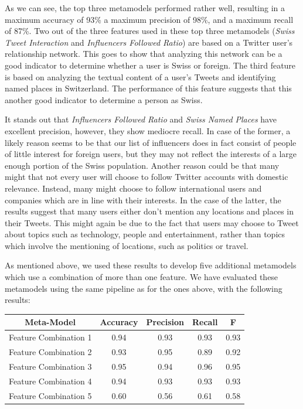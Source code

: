 \documentclass[10pt,a4paper]{article}
\begin{document}
As we can see, the top three metamodels performed rather well, resulting in a maximum accuracy of 93\% a maximum precision of 98\%, and a maximum recall of 87\%. Two out of the three features used in these top three metamodels (\textit{Swiss Tweet Interaction} and \textit{Influencers Followed Ratio}) are based on a Twitter user's relationship network. This goes to show that analyzing this network can be a good indicator to determine whether a user is Swiss or foreign. The third feature is based on analyzing the textual content of a user's Tweets and identifying named places in Switzerland. The performance of this feature suggests that this another good indicator to determine a person as Swiss.

It stands out that \textit{Influencers Followed Ratio} and \textit{Swiss Named Places} have excellent precision, however, they show mediocre recall. In case of the former, a likely reason seems to be that our list of influencers does in fact consist of people of little interest for foreign users, but they may not reflect the interests of a large enough portion of the Swiss population. Another reason could be that many might that not every user will choose to follow Twitter accounts with domestic relevance. Instead, many might choose to follow international users and companies which are in line with their interests. In the case of the latter, the results suggest that many  users either don't mention any locations and places in their Tweets. This might again be due to the fact that users may choose to Tweet about topics such as technology, people and entertainment, rather than topics which involve the mentioning of locations, such as politics or travel.

As mentioned above, we used these results to develop five additional metamodels which use a combination of more than one feature. We have evaluated these metamodels using the same pipeline as for the ones above, with the following results:

\begin{center}
\begin{tabular}{ |c|c|c|c|c| }
\hline
\textbf{Meta-Model} & \textbf{Accuracy} & \textbf{Precision} & \textbf{Recall} & \textbf{F} \\
\hline
Feature Combination 1 & 0.94 & 0.93 & 0.93 & 0.93 \\
\hline
Feature Combination 2 & 0.93 & 0.95 & 0.89 & 0.92 \\
\hline
Feature Combination 3 & 0.95 & 0.94 & 0.96 & 0.95 \\
\hline
Feature Combination 4 & 0.94 & 0.93 & 0.93 & 0.93 \\
\hline
Feature Combination 5 & 0.60 & 0.56 & 0.61 & 0.58 \\
\hline
\end{tabular}
\end{center}
\end{document}
